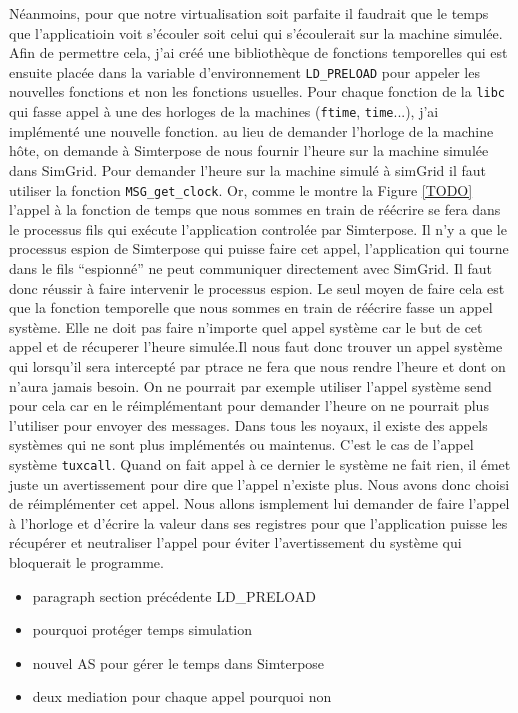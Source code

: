 Néanmoins, pour que notre virtualisation soit parfaite il faudrait que le temps que l'applicatioin voit s'écouler soit celui qui s'écoulerait sur la machine simulée. Afin de permettre cela, j'ai créé une bibliothèque de fonctions temporelles qui est ensuite placée dans la variable d'environnement \texttt{LD\_PRELOAD} pour appeler les nouvelles fonctions et non les fonctions usuelles. Pour chaque fonction de la \texttt{libc} qui fasse appel à une des horloges de la machines (\texttt{ftime}, \texttt{time}...), j'ai implémenté une nouvelle fonction. au lieu de demander l'horloge de la machine hôte, on demande à Simterpose de nous fournir l'heure sur la machine simulée dans SimGrid. Pour demander l'heure sur la machine simulé à simGrid il faut utiliser la fonction \texttt{MSG\_get\_clock}. Or, comme le montre la Figure \ref{TODO} l'appel à la fonction de temps que nous sommes en train de réécrire se fera dans le processus fils qui exécute l'application controlée par Simterpose. Il n'y a que le processus espion de Simterpose qui puisse faire cet appel, l'application qui tourne dans le fils ``espionné'' ne peut communiquer directement avec SimGrid. Il faut donc réussir à faire intervenir le processus espion. Le seul moyen de faire cela est que la fonction temporelle que nous sommes en train de réécrire fasse un appel système. Elle ne doit pas faire n'importe quel appel système car le but de cet appel et de récuperer l'heure simulée.Il nous faut donc trouver un appel système qui lorsqu'il sera intercepté par ptrace ne fera que nous rendre l'heure et dont on n'aura jamais besoin. On ne pourrait par exemple utiliser l'appel système send pour cela car en le réimplémentant pour demander l'heure on ne pourrait plus l'utiliser pour envoyer des messages. Dans tous les noyaux, il existe des appels systèmes qui ne sont plus implémentés ou maintenus. C'est le cas de l'appel système \texttt{tuxcall}. Quand on fait appel à ce dernier le système ne fait rien, il émet juste un avertissement pour dire que l'appel n'existe plus. Nous avons donc choisi de réimplémenter cet appel. Nous allons ismplement lui demander de faire l'appel à l'horloge et d'écrire la valeur dans ses registres pour que l'application puisse les récupérer et neutraliser l'appel pour éviter l'avertissement du système qui bloquerait le programme.
\begin{itemize}
\item paragraph section précédente LD\_PRELOAD
\item pourquoi protéger temps simulation
\item nouvel AS pour gérer le temps dans Simterpose
\item deux mediation pour chaque appel pourquoi non
\end{itemize}
